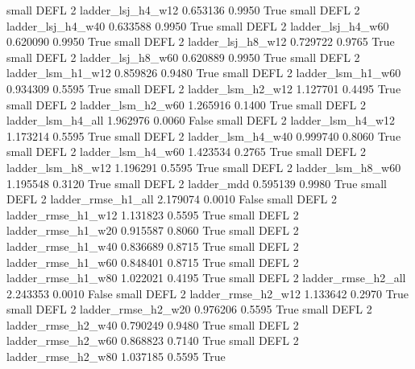      small     DEFL                 2        ladder_lsj_h4_w12   0.653136      0.9950    True
     small     DEFL                 2        ladder_lsj_h4_w40   0.633588      0.9950    True
     small     DEFL                 2        ladder_lsj_h4_w60   0.620090      0.9950    True
     small     DEFL                 2        ladder_lsj_h8_w12   0.729722      0.9765    True
     small     DEFL                 2        ladder_lsj_h8_w60   0.620889      0.9950    True
     small     DEFL                 2        ladder_lsm_h1_w12   0.859826      0.9480    True
     small     DEFL                 2        ladder_lsm_h1_w60   0.934309      0.5595    True
     small     DEFL                 2        ladder_lsm_h2_w12   1.127701      0.4495    True
     small     DEFL                 2        ladder_lsm_h2_w60   1.265916      0.1400    True
     small     DEFL                 2        ladder_lsm_h4_all   1.962976      0.0060   False
     small     DEFL                 2        ladder_lsm_h4_w12   1.173214      0.5595    True
     small     DEFL                 2        ladder_lsm_h4_w40   0.999740      0.8060    True
     small     DEFL                 2        ladder_lsm_h4_w60   1.423534      0.2765    True
     small     DEFL                 2        ladder_lsm_h8_w12   1.196291      0.5595    True
     small     DEFL                 2        ladder_lsm_h8_w60   1.195548      0.3120    True
     small     DEFL                 2               ladder_mdd   0.595139      0.9980    True
     small     DEFL                 2       ladder_rmse_h1_all   2.179074      0.0010   False
     small     DEFL                 2       ladder_rmse_h1_w12   1.131823      0.5595    True
     small     DEFL                 2       ladder_rmse_h1_w20   0.915587      0.8060    True
     small     DEFL                 2       ladder_rmse_h1_w40   0.836689      0.8715    True
     small     DEFL                 2       ladder_rmse_h1_w60   0.848401      0.8715    True
     small     DEFL                 2       ladder_rmse_h1_w80   1.022021      0.4195    True
     small     DEFL                 2       ladder_rmse_h2_all   2.243353      0.0010   False
     small     DEFL                 2       ladder_rmse_h2_w12   1.133642      0.2970    True
     small     DEFL                 2       ladder_rmse_h2_w20   0.976206      0.5595    True
     small     DEFL                 2       ladder_rmse_h2_w40   0.790249      0.9480    True
     small     DEFL                 2       ladder_rmse_h2_w60   0.868823      0.7140    True
     small     DEFL                 2       ladder_rmse_h2_w80   1.037185      0.5595    True
